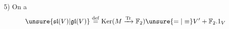 5) On a
\[
\unsure{\mathfrak{sl}(V)|\mathfrak{gl}(V)}\overset{\mathrm{def}}{=}
\operatorname{Ker}(M\xrightarrow{\operatorname{Tr}}\mathbb F_2)
\unsure{=|\equiv}V'+\mathbb F_2.1_V
\]
